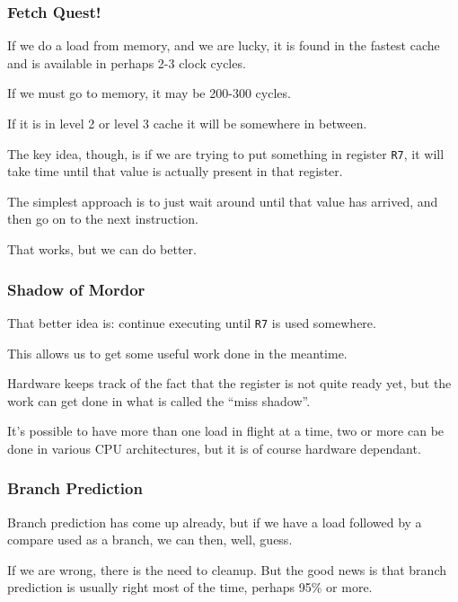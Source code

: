 \begin{frame}
\frametitle{Fetch Quest!}

If we do a load from memory, and we are lucky, it is found in the fastest cache and is available in perhaps 2-3 clock cycles. 

If we must go to memory, it may be 200-300 cycles. 

If it is in level 2 or level 3 cache it will be somewhere in between. 

The key idea, though, is if we are trying to put something in register \texttt{R7}, it will take time until that value is actually present in that register. 

The simplest approach is to just wait around until that value has arrived, and then go on to the next instruction. 

That works, but we can do better.

\end{frame}



\begin{frame}
\frametitle{Shadow of Mordor}

That better idea is: continue executing until \texttt{R7} is used somewhere. 

This allows us to get some useful work done in the meantime. 

Hardware keeps track of the fact that the register is not quite ready yet, but the work can get done in what is called the ``miss shadow''. 

It's possible to have more than one load in flight at a time, two or more can be done in various CPU architectures, but it is of course hardware dependant. 

\end{frame}



\begin{frame}
\frametitle{Branch Prediction}

Branch prediction has come up already, but if we have a load followed by a compare used as a branch, we can then, well, guess. 

If we are wrong, there is the need to cleanup. But the good news is that branch prediction is usually right most of the time, perhaps 95\% or more.

\end{frame}



